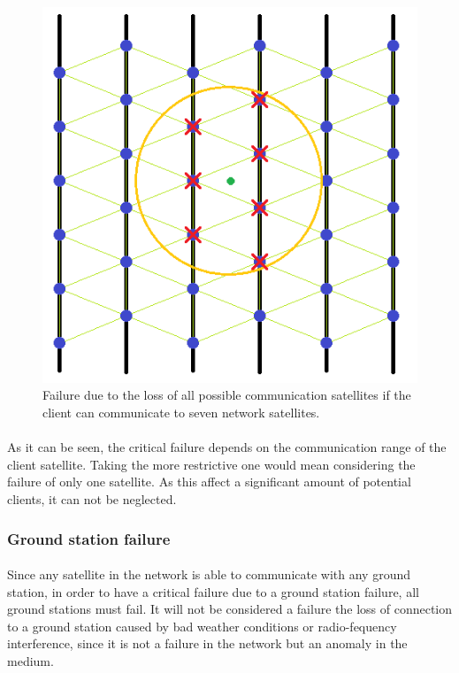 \documentclass[12pt,a4paper]{report}
\begin{document}
\begin{figure}[H]
\begin{center}
\includegraphics[scale=0.5]{critical3.PNG}
\caption[7 communication range failure]{Failure due to the loss of all possible communication satellites if the client can communicate to seven network satellites.}
\label{fig:critical3}
\end{center}
\end{figure}

\paragraph{}As it can be seen, the critical failure depends on the communication range of the client satellite. Taking the more restrictive one would mean considering the failure of only one satellite. As this affect a significant amount of potential clients, it can not be neglected.

\subsubsection{Ground station failure}

\paragraph{}Since any satellite in the network is able to communicate with any ground station, in order to have a critical failure due to a ground station failure, all ground stations must fail. It will not be considered a failure the loss of connection to a ground station caused by bad weather conditions or radio-fequency interference, since it is not a failure in the network but an anomaly in the medium.
\end{document}
